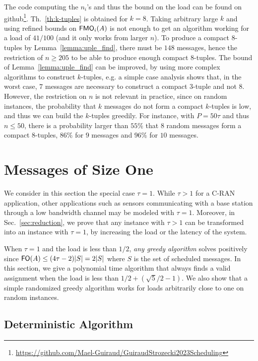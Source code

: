 \documentclass[pdflatex,sn-mathphys,iicol]{sn-jnl}%
\theoremstyle{thmstyleone}%
\theoremstyle{thmstyletwo}%
\theoremstyle{thmstylethree}%
\begin{document}
The code computing the $n_i$'s and thus the bound on the load can be found on github\footnote{\url{https://github.com/Mael-Guiraud/GuiraudStrozecki2023Scheduling}}. Th.~\ref{th:k-tuples} is obtained for $k=8$. Taking arbitrary large $k$ and using refined bounds on $\textsf{FMO}_i(A)$ is not enough to get an algorithm working for a load of $41/100$ (and it only works from larger $n$). To produce a compact $8$-tuples by Lemma~\ref{lemma:uple_find}, there must be $148$ messages, hence the restriction of $n \geq 205$ to be able to produce enough compact $8$-tuples.
The bound of Lemma~\ref{lemma:uple_find} can be improved, by using more complex algorithms to construct $k$-tuples, e.g. a simple case analysis shows that, in the worst case, $7$ messages are necessary to construct a compact $3$-tuple and not $8$. However, the restriction on $n$ is not relevant in practice, since on random instances, the probability that $k$ messages do not form a compact $k$-tuples is low, and thus we can build the $k$-tuples greedily. For instance, with $P=50\tau$ and thus $n \leq 50$, there is a probability larger than $55\%$ that $8$ random messages form a compact $8$-tuples, $86\%$ for $9$ messages and $96\%$ for $10$ messages.


\section{Messages of Size One} \label{sec:small}

We consider in this section the special case $\tau = 1$. While $\tau > 1$ for a C-RAN application, other applications such as sensors communicating with a base station through a low bandwidth channel may be modeled with $\tau = 1$. Moreover, in Sec.~\ref{sec:reduction}, we prove that any instance with $\tau >1$ can be transformed into an instance with $\tau = 1$, by increasing the load or the latency of the system.

When $\tau = 1$ and the load is less than $1/2$, \emph{any greedy algorithm} solves \pma positively since $\textsf{FO}(A) \leq (4\tau -2)\lvert S\rvert = 2\lvert S\rvert$ where $S$ is the set of scheduled messages. In this section, we give a polynomial time algorithm that always finds a valid assignment when the load is less than $1/2 + (\sqrt{5}/2 -1)$. We also show that a simple randomized greedy algorithm
works for loads arbitrarily close to one on random instances.

\subsection{Deterministic Algorithm}
\end{document}
